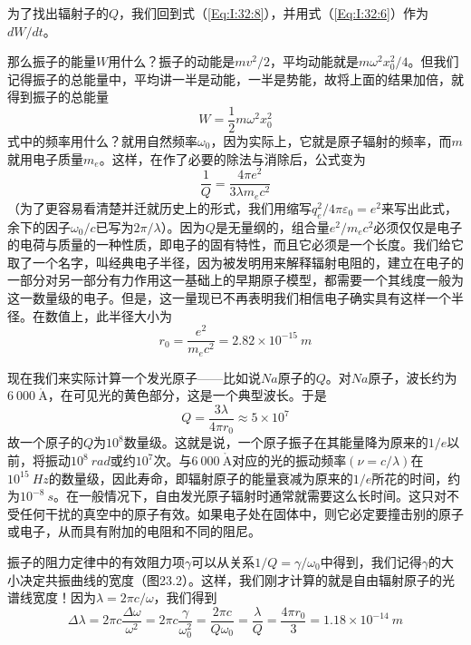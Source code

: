 为了找出辐射子的$Q$，我们回到式（\ref{Eq:I:32:8}），并用式（\ref{Eq:I:32:6}）作为$dW/dt$。

那么振子的能量$W$用什么？振子的动能是$mv^2/2$，平均动能就是$m\omega^2x_0^2/4$。但我们记得振子的总能量中，平均讲一半是动能，一半是势能，故将上面的结果加倍，就得到振子的总能量
\begin{equation}
    \label{Eq:I:32:9}
    W = \frac{1}{2}m\omega^2x_0^2
\end{equation}
式中的频率用什么？就用自然频率$\omega_0$，因为实际上，它就是原子辐射的频率，而$m$就用电子质量$m_e$。这样，在作了必要的除法与消除后，公式变为
\begin{equation}
    \label{Eq:I:32:10}
    \frac{1}{Q} = \frac{4\pi e^2}{3\lambda m_ec^2}
\end{equation}
（为了更容易看清楚并迁就历史上的形式，我们用缩写$q_e^2/4\pi\varepsilon_0=e^2$来写出此式，余下的因子$\omega_0/c$已写为$2\pi/\lambda$）。因为$Q$是无量纲的，组合量$e^2/m_ec^2$必须仅仅是电子的电荷与质量的一种性质，即电子的固有特性，而且它必须是一个长度。我们给它取了一个名字，叫经典电子半径，因为被发明用来解释辐射电阻的，建立在电子的一部分对另一部分有力作用这一基础上的早期原子模型，都需要一个其线度一般为这一数量级的电子。但是，这一量现已不再表明我们相信电子确实具有这样一个半径。在数值上，此半径大小为
\begin{equation}
    \label{Eq:I:32:11}
    r_0=\frac{e^2}{m_ec^2} = 2.82 \times 10^{-15}~m
\end{equation}

现在我们来实际计算一个发光原子——比如说$Na$原子的$Q$。对$Na$原子，波长约为$6~000~\mathring{\text{A}}$，在可见光的黄色部分，这是一个典型波长。于是
\begin{equation}
    \label{Eq:I:32:12}
    Q=\frac{3\lambda}{4\pi r_0} \approx 5 \times 10^7
\end{equation}
故一个原子的$Q$为$10^8$数量级。这就是说，一个原子振子在其能量降为原来的$1/e$以前，将振动$10^8~rad$或约$10^7$次。与$6~000~\mathring{\text{A}}$对应的光的振动频率$(\nu=c/\lambda)$在$10^{15}~Hz$的数量级，因此寿命，即辐射原子的能量衰减为原来的$1/e$所花的时间，约为$10^{-8}~s$。在一般情况下，自由发光原子辐射时通常就需要这么长时间。这只对不受任何干扰的真空中的原子有效。如果电子处在固体中，则它必定要撞击别的原子或电子，从而具有附加的电阻和不同的阻尼。

振子的阻力定律中的有效阻力项$\gamma$可以从关系$1/Q=\gamma/\omega_0$中得到，我们记得$\gamma$的大小决定共振曲线的宽度（图23.2）。这样，我们刚才计算的就是自由辐射原子的光谱线宽度！因为$\lambda=2\pi c/\omega$，我们得到
\begin{equation}
    \label{Eq:I:32:13}
    \Delta\lambda = 2\pi c \frac{\Delta\omega}{\omega^2} = 2\pi c \frac{\gamma}{\omega_0^2} = \frac{2\pi c}{Q\omega_0} = \frac{\lambda}{Q} = \frac{4\pi r_0}{3} = 1.18 \times 10^{-14}~m
\end{equation}

